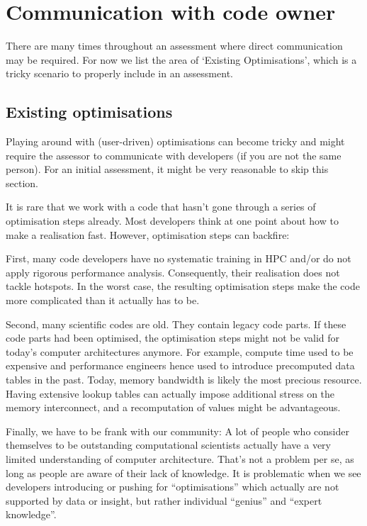 \chapter{Communication with code owner}
\label{appendix:communication}

There are many times throughout an assessment where direct communication may be required. For now we list the area of `Existing Optimisations', which is a tricky scenario to properly include in an assessment.

\section{Existing optimisations}
\label{section:communication:optimisations}

\begin{readerguide}
 Playing around with (user-driven) optimisations can become tricky and might require the assessor to communicate with developers (if you are not the same person).
 For an initial assessment, it might be very reasonable to skip this section.
\end{readerguide}

It is rare that we work with a code that hasn't gone through a series of optimisation steps already.
Most developers think at one point about how to make a realisation fast.
However, optimisation steps can backfire:


First, many code developers have no systematic training in HPC and/or do not apply rigorous performance analysis.
Consequently, their realisation does not tackle hotspots.
In the worst case, the resulting optimisation steps make the code more complicated than it actually has to be.


Second, many scientific codes are old.
They contain legacy code parts.
If these code parts had been optimised, the optimisation steps might not be valid for today's computer architectures anymore.
For example, compute time used to be expensive and performance engineers hence used to introduce precomputed data tables in the past.
Today, memory bandwidth is likely the most precious resource.
Having extensive lookup tables can actually impose additional stress on the memory interconnect, and a recomputation of values might be advantageous.


Finally, we have to be frank with our community:
A lot of people who consider themselves to be outstanding computational scientists actually have a very limited understanding of computer architecture.
That's not a problem per se, as long as people are aware of their lack of knowledge.
It is problematic when we see developers introducing or pushing for ``optimisations'' which actually are not supported by data or insight, but rather individual ``genius'' and ``expert knowledge''.



